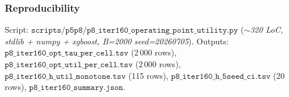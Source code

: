 \subsubsection{Reproducibility}

Script: $\texttt{scripts/p5p8/p8\_iter160\_operating\_point\_utility.py}$
(\textit{$\sim$320 LoC, stdlib + numpy + xgboost, B=2000 seed=20260705}).
Outputs:
$\texttt{p8\_iter160\_opt\_tau\_per\_cell.tsv}$ (2\,000 rows),
$\texttt{p8\_iter160\_opt\_util\_per\_cell.tsv}$ (2\,000 rows),
$\texttt{p8\_iter160\_h\_util\_monotone.tsv}$ (115 rows),
$\texttt{p8\_iter160\_h\_5seed\_ci.tsv}$ (20 rows),
$\texttt{p8\_iter160\_summary.json}$.
